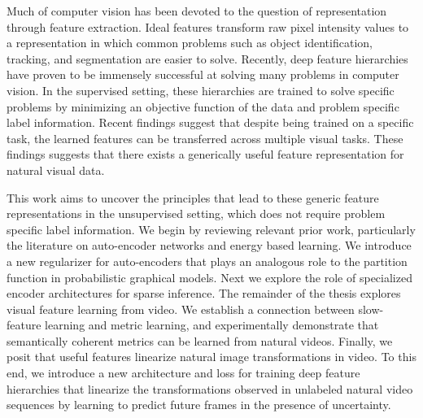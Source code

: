 Much of computer vision has been devoted to the question of representation
through feature extraction. Ideal features transform raw pixel intensity
values to a representation in which common problems such as object identification,
tracking, and segmentation are easier to solve. Recently, deep
feature hierarchies have proven to be immensely successful at solving many
problems in computer vision. In the supervised setting, these hierarchies are
trained to solve specific problems by minimizing an objective function of the
data and problem specific label information. Recent findings suggest that
despite being trained on a specific task, the learned features can be
transferred across multiple visual tasks. These findings suggests that there
exists a generically useful feature representation for natural visual data.    

This work aims to uncover the principles that lead to these generic feature
representations in the unsupervised setting, which does not require problem
specific label information. We begin by reviewing relevant prior work,
particularly the literature on auto-encoder networks and energy based learning.
We introduce a new regularizer for auto-encoders that plays an analogous role
to the partition function in probabilistic graphical models.  Next we explore
the role of specialized encoder architectures for sparse inference. The
remainder of the thesis explores visual feature learning from video. We
establish a connection between slow-feature learning and metric learning, and
experimentally demonstrate that semantically coherent metrics can be learned
from natural videos. Finally, we posit that useful features linearize
natural image transformations in video. To this end, we introduce a new
architecture and loss for training deep feature hierarchies that linearize the
transformations observed in unlabeled natural video sequences by learning to
predict future frames in the presence of uncertainty.           


 
